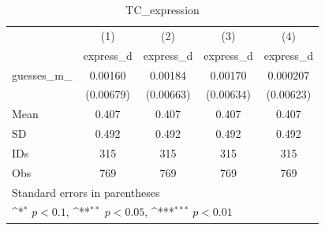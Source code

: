 \begin{table}[htbp]\centering
\def\sym#1{\ifmmode^{#1}\else\(^{#1}\)\fi}
\caption{TC\_expression}
\begin{tabular}{l*{4}{c}}
\hline\hline
                                &\multicolumn{1}{c}{(1)}&\multicolumn{1}{c}{(2)}&\multicolumn{1}{c}{(3)}&\multicolumn{1}{c}{(4)}\\
                                &\multicolumn{1}{c}{express\_d}&\multicolumn{1}{c}{express\_d}&\multicolumn{1}{c}{express\_d}&\multicolumn{1}{c}{express\_d}\\
\hline
guesses\_m\_                      &  0.00160         &  0.00184         &  0.00170         & 0.000207         \\
                                &(0.00679)         &(0.00663)         &(0.00634)         &(0.00623)         \\
\hline
Mean                            &    0.407         &    0.407         &    0.407         &    0.407         \\
SD                              &    0.492         &    0.492         &    0.492         &    0.492         \\
IDs                             &      315         &      315         &      315         &      315         \\
Obs                             &      769         &      769         &      769         &      769         \\
\hline\hline
\multicolumn{5}{l}{\footnotesize Standard errors in parentheses}\\
\multicolumn{5}{l}{\footnotesize \sym{*} \(p<0.1\), \sym{**} \(p<0.05\), \sym{***} \(p<0.01\)}\\
\end{tabular}
\end{table}
